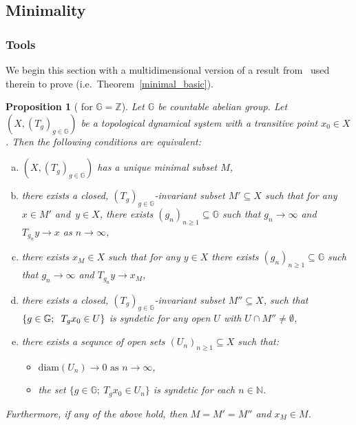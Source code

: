 \documentclass[leqno,a4paper,12pt]{article}
\newtheorem{Prop}[Th]{Proposition}
\theoremstyle{definition}
\newcommand{\Z}{{\mathbb{Z}}}
\newcommand{\N}{{\mathbb{N}}}
\newcommand{\G}{\mathbb{G}}
\begin{document}
\subsection{Minimality}
\subsubsection{Tools}
We begin this section with a multidimensional version of a result from~\cite{MR3803141} used therein to prove \cite[Theorem A]{MR3803141} (i.e.\ Theorem~\ref{minimal_basic}).
\begin{Prop}[{\cite[Proposition 2.15]{MR3803141} for $\G=\Z$}]\label{LE51new}
Let $\G$ be countable abelian group. Let $(X,(T_g)_{g\in\G})$ be a topological dynamical system with a transitive point $x_0\in X$. Then the following conditions are equivalent:
\begin{enumerate}[(a)]
\item\label{HA}
$(X,(T_g)_{g\in\G})$ has a unique minimal subset $M$,
\item\label{HB}
there exists a closed, $(T_g)_{g\in\G}$-invariant subset $M'\subseteq X$ such that
for any $x\in M'$ and~$y\in X$, there exists $(g_n)_{n\geq 1}\subseteq \G$ such that $g_n\to\infty$ and $T_{g_n}y\to x$ as $n\to\infty$,
\item\label{HC}
there exists $x_M\in X$ such that for any $y\in X$ there exists $(g_n)_{n\geq 1}\subseteq \G$ such that $g_n\to\infty$ and $T_{g_n}y\to x_M$,
\item\label{HD}
there exists a closed, $(T_g)_{g\in\G}$-invariant subset $M''\subseteq X$, such that $\left\{g\in\G;\right.\\ \left. T_gx_0 \in U\right\}$ is syndetic for any open $U$ with $U\cap M''\neq\emptyset$,
\item\label{HE}
there exists a sequnce of open sets $(U_n)_{n\geq 1}\subseteq X$ such that:
\begin{itemize}
\item
$\text{diam}(U_n)\to 0\text{ as }n\to\infty$,
\item
the set $\{g\in\G;\ T_gx_0 \in U_n\}$ is syndetic for each $n\in\N$.
\end{itemize}
\end{enumerate}
Furthermore, if any of the above hold, then $M=M'=M''$ and $x_M\in M$.
\end{Prop}
\end{document}
